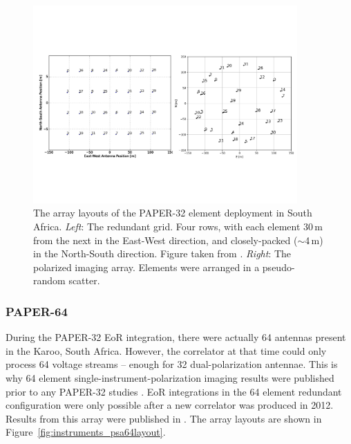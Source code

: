 \begin{figure}
\centering
\includegraphics[width=0.9\textwidth]{chapters/instruments/figures/psa32_layouts.pdf}
\caption[The array layouts of the PAPER-32 element deployment in South Africa.]{The array layouts of the PAPER-32 element deployment in South Africa. \textit{Left}: The redundant grid. Four rows, with each element 30\,m from the next in the East-West direction, and closely-packed ($\sim$4\,m) in the North-South direction. Figure taken from \cite{Parsons.14}. \textit{Right}: The polarized imaging array. Elements were arranged in a pseudo-random scatter.}
\label{fig:instruments_psa32layout}
\end{figure}

\subsubsection{PAPER-64}

During the PAPER-32 EoR integration, there were actually 64 antennas present in the Karoo, South Africa. However, the correlator at that time could only process 64 voltage streams -- enough for 32 dual-polarization antennae. This is why 64 element single-instrument-polarization imaging results were published prior to any PAPER-32 studies \citep{Jacobs.13, Stefan.13}. EoR integrations in the 64 element redundant configuration were only possible after a new correlator was produced in 2012. Results from this array were published in \cite[][Cheng et al. \textit{submitted}; Kolopanis et al. \textit{submitted}]{Ali.15, Pober.15}. The array layouts are shown in Figure~\ref{fig:instruments_psa64layout}.

